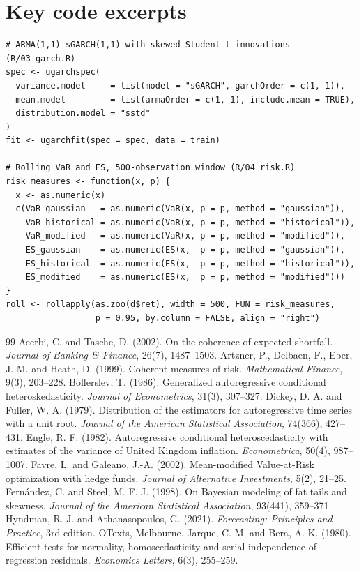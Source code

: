 \documentclass[11pt,a4paper]{article}
\begin{document}
\section{Key code excerpts}
\begin{lstlisting}
# ARMA(1,1)-sGARCH(1,1) with skewed Student-t innovations (R/03_garch.R)
spec <- ugarchspec(
  variance.model     = list(model = "sGARCH", garchOrder = c(1, 1)),
  mean.model         = list(armaOrder = c(1, 1), include.mean = TRUE),
  distribution.model = "sstd"
)
fit <- ugarchfit(spec = spec, data = train)

# Rolling VaR and ES, 500-observation window (R/04_risk.R)
risk_measures <- function(x, p) {
  x <- as.numeric(x)
  c(VaR_gaussian   = as.numeric(VaR(x, p = p, method = "gaussian")),
    VaR_historical = as.numeric(VaR(x, p = p, method = "historical")),
    VaR_modified   = as.numeric(VaR(x, p = p, method = "modified")),
    ES_gaussian    = as.numeric(ES(x,  p = p, method = "gaussian")),
    ES_historical  = as.numeric(ES(x,  p = p, method = "historical")),
    ES_modified    = as.numeric(ES(x,  p = p, method = "modified")))
}
roll <- rollapply(as.zoo(d$ret), width = 500, FUN = risk_measures,
                  p = 0.95, by.column = FALSE, align = "right")
\end{lstlisting}

\begin{thebibliography}{99}
 Acerbi, C. and Tasche, D. (2002). On the coherence of expected shortfall. \emph{Journal of Banking \& Finance}, 26(7), 1487--1503.
 Artzner, P., Delbaen, F., Eber, J.-M. and Heath, D. (1999). Coherent measures of risk. \emph{Mathematical Finance}, 9(3), 203--228.
 Bollerslev, T. (1986). Generalized autoregressive conditional heteroskedasticity. \emph{Journal of Econometrics}, 31(3), 307--327.
 Dickey, D. A. and Fuller, W. A. (1979). Distribution of the estimators for autoregressive time series with a unit root. \emph{Journal of the American Statistical Association}, 74(366), 427--431.
 Engle, R. F. (1982). Autoregressive conditional heteroscedasticity with estimates of the variance of United Kingdom inflation. \emph{Econometrica}, 50(4), 987--1007.
 Favre, L. and Galeano, J.-A. (2002). Mean-modified Value-at-Risk optimization with hedge funds. \emph{Journal of Alternative Investments}, 5(2), 21--25.
 Fern\'andez, C. and Steel, M. F. J. (1998). On Bayesian modeling of fat tails and skewness. \emph{Journal of the American Statistical Association}, 93(441), 359--371.
 Hyndman, R. J. and Athanasopoulos, G. (2021). \emph{Forecasting: Principles and Practice}, 3rd edition. OTexts, Melbourne.
 Jarque, C. M. and Bera, A. K. (1980). Efficient tests for normality, homoscedasticity and serial independence of regression residuals. \emph{Economics Letters}, 6(3), 255--259.
\end{thebibliography}
\end{document}
